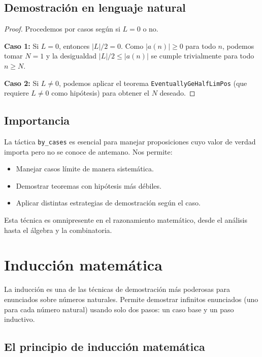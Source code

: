 \subsection{Demostración en lenguaje natural}

\begin{proof}
Procedemos por casos según si $L = 0$ o no.

\textbf{Caso 1:} Si $L = 0$, entonces $|L|/2 = 0$. Como $|a(n)| \geq 0$
para todo $n$, podemos tomar $N = 1$ y la desigualdad $|L|/2 \leq |a(n)|$
se cumple trivialmente para todo $n \geq N$.

\textbf{Caso 2:} Si $L \neq 0$, podemos aplicar el teorema
\texttt{EventuallyGeHalfLimPos} (que requiere $L \neq 0$ como hipótesis)
para obtener el $N$ deseado.
\end{proof}

\subsection{Importancia}

La táctica \texttt{by\_cases} es esencial para manejar proposiciones cuyo
valor de verdad importa pero no se conoce de antemano. Nos permite:

\begin{itemize}
  \item Manejar casos límite de manera sistemática.
  \item Demostrar teoremas con hipótesis más débiles.
  \item Aplicar distintas estrategias de demostración según el caso.
\end{itemize}

Esta técnica es omnipresente en el razonamiento matemático, desde el
análisis hasta el álgebra y la combinatoria.

\section{Inducción matemática}

La inducción es una de las técnicas de demostración más poderosas para
enunciados sobre números naturales. Permite demostrar infinitos enunciados
(uno para cada número natural) usando solo dos pasos: un caso base y un
paso inductivo.

\subsection{El principio de inducción matemática}


